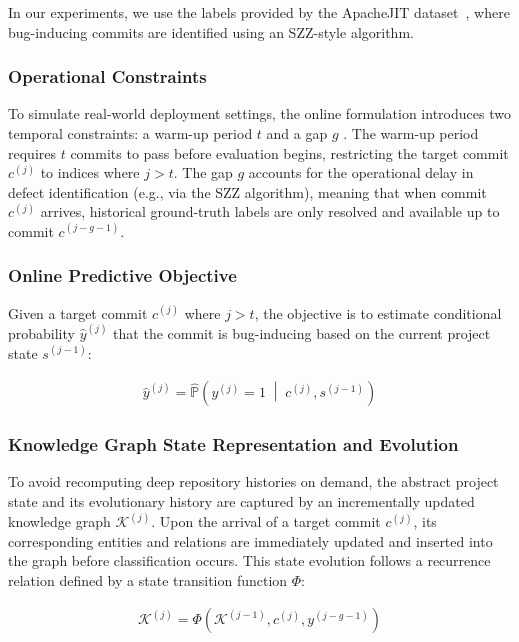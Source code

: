 \documentclass[final,5p,times,twocolumn]{elsarticle}
\theoremstyle{plain}
\begin{document}
In our experiments, we use the labels provided by the ApacheJIT dataset~\cite{keshavarz2022apachejit}, where bug-inducing commits are identified using an SZZ-style algorithm.
\subsubsection{Operational Constraints}
\label{sec:operational-constraints}
To simulate real-world deployment settings, the online formulation introduces two temporal constraints: a warm-up period $t$ and a gap $g$ \cite{lee2024neurojit,song2023validity}. The warm-up period requires $t$ commits to pass before evaluation begins, restricting the target commit $c^{(j)}$ to indices where $j > t$. The gap $g$ accounts for the operational delay in defect identification (e.g., via the SZZ algorithm), meaning that when commit $c^{(j)}$ arrives, historical ground-truth labels are only resolved and available up to commit $c^{(j-g-1)}$.

\subsubsection{Online Predictive Objective}
\label{sec:online-objective}
Given a target commit $c^{(j)}$ where $j > t$, the objective is to estimate conditional probability $\hat{y}^{(j)}$ that the commit is bug-inducing based on the current project state $s^{(j-1)}$:

\begin{align}
\hat{y}^{(j)} = \hat{\mathbb{P}}\left( y^{(j)} = 1 \;\middle|\; c^{(j)}, s^{(j-1)} \right)
\end{align}

\subsubsection{Knowledge Graph State Representation and Evolution}
\label{sec:kg_evolution}
To avoid recomputing deep repository histories on demand, the abstract project state and its evolutionary history are captured by an incrementally updated knowledge graph $\mathcal{K}^{(j)}$. Upon the arrival of a target commit $c^{(j)}$, its corresponding entities and relations are immediately updated and inserted into the graph before classification occurs. This state evolution follows a recurrence relation defined by a state transition function $\Phi$:

\begin{align}
\mathcal{K}^{(j)} = \Phi\left(\mathcal{K}^{(j-1)}, c^{(j)}, y^{(j-g-1)}\right)
\end{align}
\end{document}
